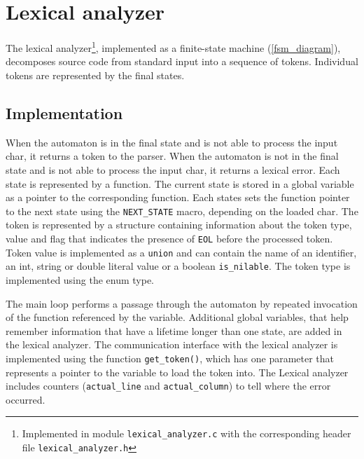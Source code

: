 \section{Lexical analyzer}
\label{Lexical analyzer}

The lexical analyzer\footnote{Implemented in module \texttt{lexical\_analyzer.c} with the corresponding header file \texttt{lexical\_analyzer.h}}, implemented as a finite-state machine (\ref{fsm_diagram}), decomposes source code from standard input into a sequence of tokens. Individual tokens are represented by the final states.

\subsection{Implementation}
When the automaton is in the final state and is not able to process the input char, it returns a token to the parser. When the automaton is not in the final state and is not able to process the input char, it returns a lexical error.
Each state is represented by a function. The current state is stored in a global variable as a pointer to the corresponding function. Each states sets the function pointer to the next state using the \texttt{NEXT\_STATE} macro, depending on the loaded char.
The token is represented by a structure containing information about the token type, value and flag that indicates the presence of \texttt{EOL} before the processed token. Token value is implemented as a \texttt{union} and can contain the name of an identifier, an int, string or double literal value or a boolean \texttt{is\_nilable}. The token type is implemented using the enum type.

The main loop performs a passage through the automaton by repeated invocation of the function referenced by the variable.
Additional global variables, that help remember information that have a lifetime longer than one state, are added in the lexical analyzer.
The communication interface with the lexical analyzer is implemented using the function \verb|get_token()|, which has one parameter that represents a pointer to the variable to load the token into.
The Lexical analyzer includes counters (\verb|actual_line| and \verb|actual_column|) to tell where the error occurred.

\newpage

